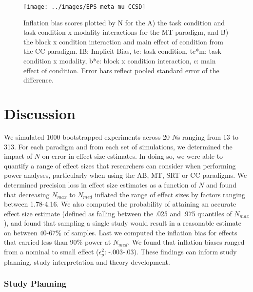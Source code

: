 \documentclass[
  man]{apa6}
\begin{document}
\begin{figure}

{\centering \texttt{[image: ../images/EPS\_meta\_mu\_CCSD]} 

}

\caption{Inflation bias scores plotted by N for the A) the task condition and task condition x modality interactions for the MT paradigm, and B) the block x condition interaction and main effect of condition from the CC paradigm. IB: Implicit Bias, tc: task condition, tc*m: task condition x modality, b*c: block x condition interaction, c: main effect of condition. Error bars reflect pooled standard error of the difference.}\label{fig:infbias}
\end{figure}

\hypertarget{discussion}{%
\section{Discussion}\label{discussion}}

\label{sec:Discussion}

We simulated 1000 bootstrapped experiments across 20 \(N\)s ranging from 13 to 313. For each paradigm and from each set of simulations, we determined the impact of \(N\) on error in effect size estimates. In doing so, we were able to quantify a range of effect sizes that researchers can consider when performing power analyses, particularly when using the AB, MT, SRT or CC paradigms. We determined precision loss in effect size estimates as a function of \(N\) and found that decreasing \(N_{max}\) to \(N_{med}\) inflated the range of effect sizes by factors ranging between 1.78-4.16. We also computed the probability of attaining an accurate effect size estimate (defined as falling between the .025 and .975 quantiles of \(N_{max}\)), and found that sampling a single study would result in a reasonable estimate on between 40-67\% of samples. Last we computed the inflation bias for effects that carried less than 90\% power at \(N_{med}\). We found that inflation biases ranged from a nominal to small effect (\(\epsilon_{p}^2\): -.003-.03). These findings can inform study planning, study interpretation and theory development.

\hypertarget{study-planning}{%
\subsubsection{Study Planning}\label{study-planning}}
\end{document}
